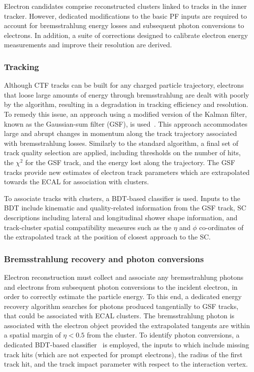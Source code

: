 Electron candidates comprise reconstructed clusters linked to tracks in the inner tracker. However, dedicated modifications to the basic PF inputs are required to account for bremsstrahlung energy losses and subsequent photon conversions to electrons. In addition, a suite of corrections designed to calibrate electron energy measurements and improve their resolution are derived.

\subsubsection{Tracking}

Although CTF tracks can be built for any charged particle trajectory, electrons that loose large amounts of energy through bremsstrahlung are dealt with poorly by the algorithm, resulting in a degradation in tracking efficiency and resolution. To remedy this issue, an approach using a modified version of the Kalman filter, known as the Gaussian-sum filter (GSF), is used~\cite{GSF}. This approach accommodates large and abrupt changes in momentum along the track trajectory associated with bremsstrahlung losses. Similarly to the standard algorithm, a final set of track quality selection are applied, including thresholds on the number of hits, the $\chi^{2}$ for the GSF track, and the energy lost along the trajectory. The GSF tracks provide new estimates of electron track parameters which are extrapolated towards the ECAL for association with clusters.

To associate tracks with clusters, a BDT-based classifier is used. Inputs to the BDT include kinematic and quality-related information from the GSF track, SC descriptions including lateral and longitudinal shower shape information, and track-cluster spatial compatibility measures such as the $\eta$ and $\phi$ co-ordinates of the extrapolated track at the position of closest approach to the SC.


\subsubsection{Bremsstrahlung recovery and photon conversions}

Electron reconstruction must collect and associate any bremsstrahlung photons and electrons from subsequent photon conversions to the incident electron, in order to correctly estimate the particle energy. To this end, a dedicated energy recovery algorithm searches for photons produced tangentially to GSF tracks, that could be associated with ECAL clusters. The bremsstrahlung photon is associated with the electron object provided the extrapolated tangents are within a spatial margin of $\eta<0.5$ from the cluster. To identify photon conversions, a dedicated BDT-based classifier~\cite{photon_conversion_finder} is employed, the inputs to which include missing track hits (which are not expected for prompt electrons), the radius of the first track hit, and the track impact parameter with respect to the interaction vertex. 



